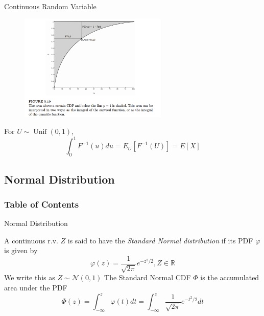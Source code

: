 \documentclass[8pt]{beamer}
\newcommand{\myunif}[2]{\operatorname{Unif}\!\left(#1, #2\right)}
\begin{document}
\begin{frame}{Continuous Random Variable}
    \begin{figure}
        \centering
        \includegraphics[width=0.63\textwidth]{fig4.png}
    \end{figure}

    For $U \sim \myunif{0}{1}$, \[\int_0^1 F^{-1}(u) du = E_{U}[F^{-1}(U)]= E[X]\]

\end{frame}

\subsection{Normal Distribution}

\begin{frame}
    \frametitle{Table of Contents}
    \tableofcontents[currentsubsection]
\end{frame}

\begin{frame}{Normal Distribution}
    \begin{definition}
        A continuous r.v. $Z$ is said to have the \textit{Standard Normal distribution} if its PDF $\varphi$ is given by
        \[\varphi (z) = \frac{1}{\sqrt{2\pi}} e^{-z^2/2}, Z \in \mathbb{R}\]
        We write this as $Z \sim \mathcal{N}(0,1)$
        The Standard Normal CDF $\Phi$ is the accumulated area under the PDF
        \[ \Phi(z) = \int^z_{-\infty} \varphi(t) dt = \int^z_{-\infty}\frac{1}{\sqrt{2\pi}}e^{-t^2/2}dt\]
    \end{definition}
\end{frame}
\end{document}
